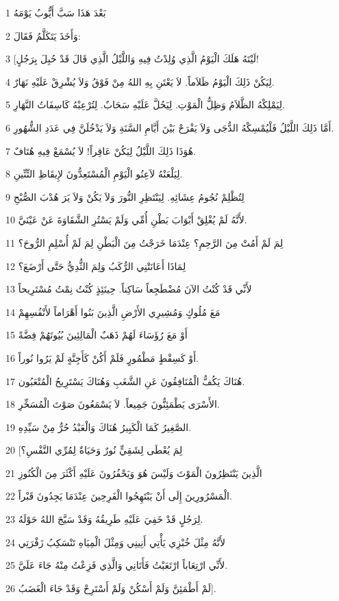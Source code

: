\par 1 بَعْدَ هَذَا سَبَّ أَيُّوبُ يَوْمَهُ
\par 2 وَأَخَذَ يَتَكَلَّمُ فَقَالَ:
\par 3 [لَيْتَهُ هَلَكَ الْيَوْمُ الَّذِي وُلِدْتُ فِيهِ وَاللَّيْلُ الَّذِي قَالَ قَدْ حُبِلَ بِرَجُلٍ!
\par 4 لِيَكُنْ ذَلِكَ الْيَوْمُ ظَلاَماً. لاَ يَعْتَنِ بِهِ اللهُ مِنْ فَوْقُ وَلاَ يُشْرِقْ عَلَيْهِ نَهَارٌ.
\par 5 لِيَمْلِكْهُ الظَّلاَمُ وَظِلُّ الْمَوْتِ. لِيَحُلَّ عَلَيْهِ سَحَابٌ. لِتُرْعِبْهُ كَاسِفَاتُ النَّهَارِ.
\par 6 أَمَّا ذَلِكَ اللَّيْلُ فَلْيُمْسِكْهُ الدُّجَى وَلاَ يَفْرَحْ بَيْنَ أَيَّامِ السَّنَةِ وَلاَ يَدْخُلَنَّ فِي عَدَدِ الشُّهُورِ.
\par 7 هُوَذَا ذَلِكَ اللَّيْلُ لِيَكُنْ عَاقِراً! لاَ يُسْمَعْ فِيهِ هُتَافٌ.
\par 8 لِيَلْعَنْهُ لاَعِنُو الْيَوْمِ الْمُسْتَعِدُّونَ لإِيقَاظِ التِّنِّينِ.
\par 9 لِتُظْلِمْ نُجُومُ عِشَائِهِ. لِيَنْتَظِرِ النُّورَ وَلاَ يَكُنْ وَلاَ يَرَ هُدْبَ الصُّبْحِ
\par 10 لأَنَّهُ لَمْ يُغْلِقْ أَبْوَابَ بَطْنِ أُمِّي وَلَمْ يَسْتُرِ الشَّقَاوَةَ عَنْ عَيْنَيَّ.
\par 11 لِمَ لَمْ أَمُتْ مِنَ الرَّحِمِ؟ عِنْدَمَا خَرَجْتُ مِنَ الْبَطْنِ لِمَ لَمْ أُسْلِمِ الرُّوحَ؟
\par 12 لِمَاذَا أَعَانَتْنِي الرُّكَبُ وَلِمَ الثُّدِيُّ حَتَّى أَرْضَعَ؟
\par 13 لأَنِّي قَدْ كُنْتُ الآنَ مُضْطَجِعاً سَاكِناً. حِينَئِذٍ كُنْتُ نِمْتُ مُسْتَرِيحاً
\par 14 مَعَ مُلُوكٍ وَمُشِيرِي الأَرْضِ الَّذِينَ بَنُوا أَهْرَاماً لأَنْفُسِهِمْ
\par 15 أَوْ مَعَ رُؤَسَاءَ لَهُمْ ذَهَبٌ الْمَالِئِينَ بُيُوتَهُمْ فِضَّةً
\par 16 أَوْ كَسِقْطٍ مَطْمُورٍ فَلَمْ أَكُنْ كَأَجِنَّةٍ لَمْ يَرُوا نُوراً.
\par 17 هُنَاكَ يَكُفُّ الْمُنَافِقُونَ عَنِ الشَّغَبِ وَهُنَاكَ يَسْتَرِيحُ الْمُتْعَبُون.
\par 18 الأَسْرَى يَطْمَئِنُّونَ جَمِيعاً. لاَ يَسْمَعُونَ صَوْتَ الْمُسَخِّرِ.
\par 19 الصَّغِيرُ كَمَا الْكَبِيرُ هُنَاكَ وَالْعَبْدُ حُرٌّ مِنْ سَيِّدِهِ.
\par 20 [لِمَ يُعْطَى لِشَقِيٍّ نُورٌ وَحَيَاةٌ لِمُرِّي النَّفْسِ؟
\par 21 الَّذِينَ يَنْتَظِرُونَ الْمَوْتَ وَلَيْسَ هُوَ وَيَحْفُرُونَ عَلَيْهِ أَكْثَرَ مِنَ الْكُنُوزِ
\par 22 الْمَسْرُورِينَ إِلَى أَنْ يَبْتَهِجُوا الْفَرِحِينَ عِنْدَمَا يَجِدُونَ قَبْراً.
\par 23 لِرَجُلٍ قَدْ خَفِيَ عَلَيْهِ طَرِيقُهُ وَقَدْ سَيَّجَ اللهُ حَوْلَهُ.
\par 24 لأَنَّهُ مِثْلَ خُبْزِي يَأْتِي أَنِينِي وَمِثْلَ الْمِيَاهِ تَنْسَكِبُ زَفْرَتِي
\par 25 لأَنِّي ارْتِعَاباً ارْتَعَبْتُ فَأَتَانِي وَالَّذِي فَزِعْتُ مِنْهُ جَاءَ عَلَيَّ.
\par 26 لَمْ أَطْمَئِنَّ وَلَمْ أَسْكُنْ وَلَمْ أَسْتَرِحْ وَقَدْ جَاءَ الْغَضَبُ].

